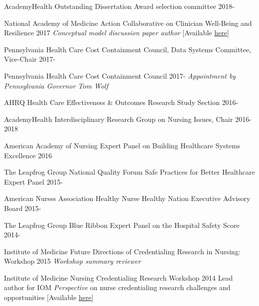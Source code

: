 \documentclass[10pt,]{article}
\begin{document}
{{{{{{{{{{{{{{{AcademyHealth Outstanding Dissertation Award selection committee \hfill {2018-{\small{}}}

National Academy of Medicine Action Collaborative on Clinician Well-Being and Resilience  \hfill {2017} \newline
\hspace*{0.5 cm} {\textit {Conceptual model discussion paper author}} [Available \href{https://nam.edu/journey-construct-encompassing-conceptual-model-factors-affecting-clinician-well-resilience/}{\ttfamily here}]

Pennsylvania Health Care Cost Containment Council, Data Systems Committee, Vice-Chair \hfill {2017-{\small{}}} 

Pennsylvania Health Care Cost Containment Council \hfill {2017-{\small{}}} \newline
\hspace*{0.5 cm} {\textit {Appointment by Pennsylvania Governor Tom Wolf }}

AHRQ Health Care Effectiveness \& Outcomes Research Study Section \hfill {2016-{\small{}}}

AcademyHealth Interdisciplinary Research Group on Nursing Issues, Chair \hfill 2016-2018

American Academy of Nursing Expert Panel on Building Healthcare Systems Excellence \hfill 2016

The Leapfrog Group National Quality Forum Safe Practices for Better Healthcare Expert Panel  \hfill {2015-{\small{}}}	

American Nurses Association Healthy Nurse Healthy Nation Executive Advisory Board  \hfill {2015-{\small{}}}	

The Leapfrog Group Blue Ribbon Expert Panel on the Hospital Safety Score  \hfill {2014-{\small{}}}	

Institute of Medicine Future Directions of Credentialing Research in Nursing: Workshop \hfill 2015 \newline
\hspace*{0.5 cm} {\textit {Workshop summary reviewer}}

Institute of Medicine Nursing Credentialing Research Workshop \hfill 2014 \newline
\hspace*{0.5 cm} {Lead author for IOM {\textit {Perspective}} on nurse credentialing research challenges and opportunities} [Available \href{https://nam.edu/wp-content/uploads/2015/06/CredentialingResearchDesign.pdf}{\ttfamily here}]

}}}}}}}}}}}}}}}
\end{document}
